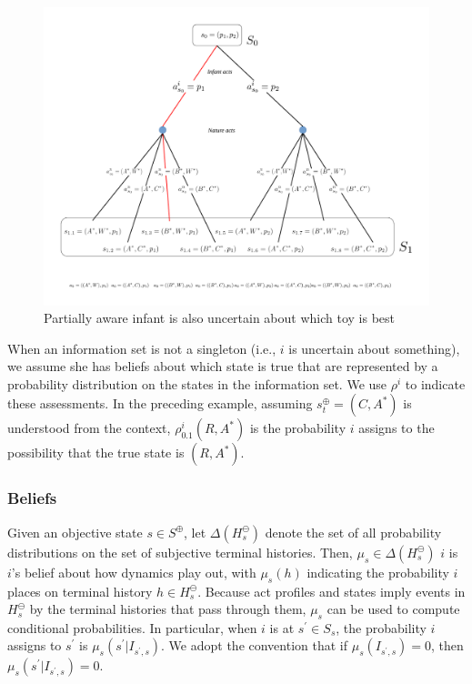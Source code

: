 \documentclass[
11pt,
titlepage,
reqno,
]{article}%
\theoremstyle{definition}
\begin{document}
\begin{figure}[h!]
	\centering
	\includegraphics*[page=3,trim = 0in 6in 6.5in 0in,scale=.8]{Awareness_Diagrams_All}
	\caption{Partially aware infant is also uncertain about which toy is best\label{Diag: p-03}}%
\end{figure}
	
When an information set is not a singleton (i.e., $i$ is uncertain about something), we assume she has beliefs about which state is true that are represented by a probability distribution on the states in the information set. 
We use $\rho^i$ to indicate these assessments. 
In the preceding example, assuming $s^\oplus_t=(C,A^\ast)$ is understood from the context, $\rho^i_{0.1}(R,A^\ast)$ is the probability $i$ assigns to the possibility that the true state is $(R,A^\ast)$.
	
\subsubsection{Beliefs} \label{sec: beliefs}
Given an objective state $s\in S^\oplus$, let $\Delta(H^\ominus_s)$ denote the set of all probability distributions on the set of subjective terminal histories. 
Then,  $\mu_s\in \Delta(H^\ominus_s)$ $i$ is $i$'s belief about how dynamics play out, with $\mu_s(h)$ indicating the probability $i$ places on terminal history $h\in H^\ominus_s$. 
Because act profiles and states imply events in $H^\ominus_s$ by the terminal histories that pass through them, $\mu_s$ can be used to compute conditional probabilities.
In particular, when $i$ is at $s^\prime\in S_s$, the probability $i$ assigns to $s^\prime$ is  $\mu_s(s^\prime|I_{s^\prime,s})$.
We adopt the convention that if  $\mu_s(I_{s^\prime,s})=0$, then  $\mu_s(s^\prime|I_{s^\prime,s})=0$.
\end{document}
